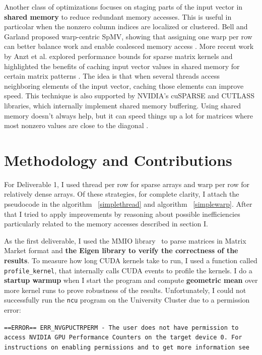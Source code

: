 \documentclass[conference]{IEEEtran}
\begin{document}
Another class of optimizations focuses on staging parts of the input vector in \textbf{shared memory} to reduce redundant memory accesses. This is useful in particolar when the nonzero column indices are localized or clustered. Bell and Garland proposed warp-centric SpMV, showing that assigning one warp per row can better balance work and enable coalesced memory access \cite{bell2008efficient}. More recent work by Anzt et al. explored performance bounds for sparse matrix kernels and highlighted the benefits of caching input vector values in shared memory for certain matrix patterns \cite{anzt2017designing}. The idea is that when several threads access neighboring elements of the input vector, caching those elements can improve speed. This technique is also supported by NVIDIA's cuSPARSE and CUTLASS libraries, which internally implement shared memory buffering. Using shared memory doesn't always help, but it can speed things up a lot for matrices where most nonzero values are close to the diagonal \cite{madduri2019spmv}.

\section{Methodology and Contributions}\label{sec:methodology}

For Deliverable 1, I used thread per row for sparse arrays and warp per row for relatively dense arrays. Of these strategies, for complete clarity, I attach the pseudocode in the algorithm ~\ref{simplethread} and algorithm ~\ref{simplewarp}. After that I tried to apply improvements by reasoning about possible inefficiencies particularly related to the memory accesses described in section I.

As the first deliverable, I used the MMIO library~\cite{matrixmarketmmio} to parse matrices in Matrix Market format and \textbf{the Eigen library to verify the correctness of the results}. To measure how long CUDA kernels take to run, I used a function called \texttt{profile\_kernel}, that internally calls CUDA events to profile the kernels. I do a \textbf{startup warmup} when I start the program and compute \textbf{geometric mean} over more kernel runs to prove robustness of the results. Unfortunately, I could not successfully run the \texttt{ncu} program on the University Cluster due to a permission error:

\vspace{0.3cm}
\texttt{==ERROR== ERR\_NVGPUCTRPERM - The user does not have permission to access NVIDIA GPU Performance Counters on the target device 0. For instructions on enabling permissions and to get more information see}
\vspace{0.3cm}
\end{document}
